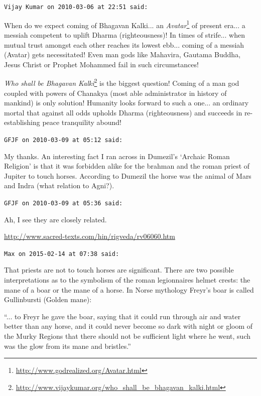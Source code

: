 \begin{footnotesize}
\begin{sffamily}
\texttt{Vijay Kumar on 2010-03-06 at 22:51 said:}

When do we expect coming of Bhagavan Kalki... an \textit{Avatar}\footnote{\url{http://www.godrealized.org/Avatar.html}} of present era... a messiah competent to uplift Dharma (righteousness)! In times of strife... when mutual trust amongst each other reaches its lowest ebb... coming of a messiah (Avatar) gets necessitated! Even man gods like Mahavira, Gautama Buddha, Jesus Christ or Prophet Mohammed fail in such circumstances!

\textit{Who shall be Bhagavan Kalki}\footnote{\url{http://www.vijaykumar.org/who_shall_be_bhagavan_kalki.html}} is the biggest question! Coming of a man god coupled with powers of Chanakya (most able administrator in history of mankind) is only solution! Humanity looks forward to such a one... an ordinary mortal that against all odds upholds Dharma (righteousness) and succeeds in re-establishing peace tranquility abound!

\hfill

\texttt{GFJF on 2010-03-09 at 05:12 said:}

My thanks. An interesting fact I ran across in Dumezil's `Archaic Roman Religion' is that it was forbidden alike for the brahman and the roman priest of Jupiter to touch horses. According to Dumezil the horse was the animal of Mars and Indra (what relation to Agni?).

\hfill

\texttt{GFJF on 2010-03-09 at 05:36 said:}

Ah, I see they are closely related.

\url{http://www.sacred-texts.com/hin/rigveda/rv06060.htm}


\hfill

\texttt{Max on 2015-02-14 at 07:38 said:}

That priests are not to touch horses are significant. There are two possible interpretations as to the symbolism of the roman legionnaires helmet crests: the mane of a boar or the mane of a horse. In Norse mythology Freyr's boar is called Gullinbursti (Golden mane):

``... to Freyr he gave the boar, saying that it could run through air and water better than any horse, and it could never become so dark with night or gloom of the Murky Regions that there should not be sufficient light where he went, such was the glow from its mane and bristles.''


\end{sffamily}
\end{footnotesize}
